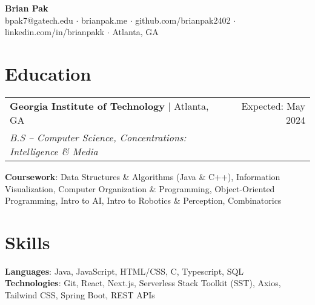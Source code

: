 \documentclass[letterpaper,11pt]{article}
\makeatletter
\newcommand{\resumeEducationHeading}[5]{
    \begin{tabular*}{0.99\textwidth}[t]{l@{\extracolsep{\fill}}r}
      \textbf{#1} $\vert$ #2 & #3 \\
      \textit{\small#4} & \textit{\small #5} \\
    \end{tabular*}\vspace{0.5pt}
}
\newcommand{\resumeExperienceHeading}[3]{
    \begin{tabular*}{0.99\textwidth}[t]{l@{\extracolsep{\fill}}r}
      \textbf{#1} $\vert$ {#2} & {#3} \\
    \end{tabular*}\vspace{-3pt}
}
\newcommand{\resumeItemListStart}{\begin{itemize}[noitemsep]\vspace{-4pt}}
\newcommand{\resumeItemListEnd}{\end{itemize}}
\makeatother
\begin{document}
\begin{center}
  \textbf{\huge Brian Pak} \\
  \vspace*{0.1cm}
  {bpak7@gatech.edu} $\cdot$ {brianpak.me} $\cdot$ {github.com/brianpak2402} $\cdot$ {linkedin.com/in/brianpakk}  $\cdot$ Atlanta, GA
\end{center}

\section{Education}
    \resumeEducationHeading
      {Georgia Institute of Technology}{Atlanta, GA}{Expected: May 2024}
      {B.S -- Computer Science, Concentrations: Intelligence \& Media}{\vspace{0.1cm}} 
    \textbf{Coursework}{: Data Structures \& Algorithms (Java \& C++), Information Visualization, Computer Organization \& Programming, Object-Oriented Programming, Intro to AI, Intro to Robotics \& Perception, Combinatorics} \\

  
\section{Skills}
    \textbf{Languages}{: Java, JavaScript, HTML/CSS, C, Typescript, SQL} \\
    \textbf{Technologies}{: Git, React, Next.js, Serverless Stack Toolkit (SST), Axios, Tailwind CSS, Spring Boot, REST APIs}
\end{document}
